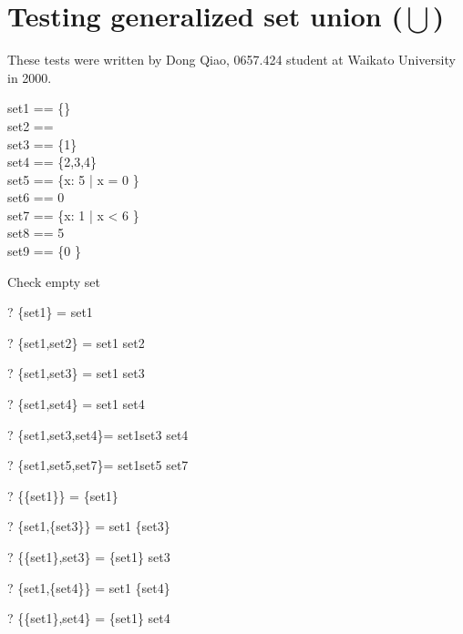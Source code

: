 \documentclass{article}
\begin{document}
\section{Testing generalized set union ($\bigcup$)}
These tests were written by Dong Qiao, 0657.424 student at Waikato 
University in 2000.
\begin{zed}
set1 == \{\} \\                 %
set2 == \emptyset \\            %
set3 == \{1\} \\                %
set4 == \{2,3,4\} \\            %
set5 == \{x: 5  | x  = 0 \} \\
set6 == 0   \\
set7 == \{x: 1  | x < 6 \} \\
set8 == 5  \\
set9 == \{0 \} \\
\end{zed}

Check empty set
\begin{zed}\vdash? \bigcup \{set1\}        = set1 \end{zed}
\begin{zed}\vdash? \bigcup \{set1,set2\}   = set1 \cup set2 \end{zed}
\begin{zed}\vdash? \bigcup \{set1,set3\}   = set1 \cup set3 \end{zed}
\begin{zed}\vdash? \bigcup \{set1,set4\}   = set1 \cup set4 \end{zed}
\begin{zed}\vdash? \bigcup\{set1,set3,set4\}= set1\cup set3 \cup set4\end{zed}
\begin{zed}\vdash? \bigcup\{set1,set5,set7\}= set1\cup set5 \cup set7\end{zed}
\begin{zed}\vdash? \bigcup \{\{set1\}\}      = \{set1\} \end{zed}
\begin{zed}\vdash? \bigcup \{set1,\{set3\}\} = set1 \cup \{set3\} \end{zed}
\begin{zed}\vdash? \bigcup \{\{set1\},set3\} = \{set1\} \cup set3 \end{zed}
\begin{zed}\vdash? \bigcup \{set1,\{set4\}\} = set1 \cup \{set4\} \end{zed}
\begin{zed}\vdash? \bigcup \{\{set1\},set4\} = \{set1\} \cup set4 \end{zed}
\end{document}
